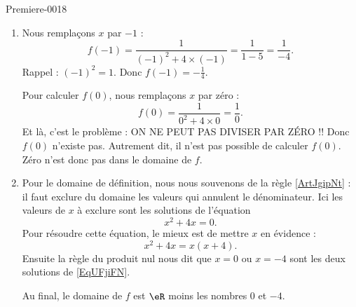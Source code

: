 
\begin{corrige}{Premiere-0018}

    \begin{enumerate}
        \item
            Nous remplaçons \( x\) par \( -1\) :
            \begin{equation}
                f(-1)=\frac{1}{ (-1)^2+4\times (-1) }=\frac{1}{ 1-5 }=\frac{1}{ -4 }.
            \end{equation}
            Rappel : \( (-1)^2=1\). Donc \( f(-1)=-\frac{1}{ 4 }\).

            Pour calculer \( f(0)\), nous remplaçons \( x\) par zéro :
            \begin{equation}
                f(0)=\frac{1}{  0^2+4\times 0 }=\frac{1}{ 0 }.
            \end{equation}
            Et là, c'est le problème : ON NE PEUT PAS DIVISER PAR ZÉRO !! Donc \( f(0)\) n'existe pas. Autrement dit, il n'est pas possible de calculer \( f(0)\). Zéro n'est donc pas dans le domaine de \( f\).

        \item
            Pour le domaine de définition, nous nous souvenons de la règle \ref{ArtJgipNt} : il faut exclure du domaine les valeurs qui annulent le dénominateur. Ici les valeurs de \( x\) à exclure sont les solutions de l'équation
            \begin{equation}    \label{EqUFjiFN}
                x^2+4x=0.
            \end{equation}
            Pour résoudre cette équation, le mieux est de mettre \( x\) en évidence :
            \begin{equation}
                x^2+4x=x(x+4).
            \end{equation}
            Ensuite la règle du produit nul nous dit que \( x=0\) ou \( x=-4\) sont les deux solutions de \eqref{EqUFjiFN}.

            Au final, le domaine de \( f\) est \( \eR\) moins les nombres \( 0\) et \( -4\).
    \end{enumerate}

\end{corrige}
